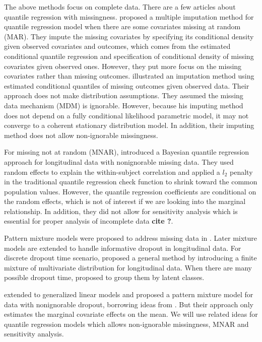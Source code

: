 \documentclass[12pt]{article}
\begin{document}
The above methods focus on complete data.  There are a few articles
about quantile regression with missingness.  \citet{wei2012} proposed
a multiple imputation method for quantile regression model when there
are some covariates missing at random (MAR). They impute the missing
covariates by specifying its conditional density given observed
covariates and outcomes, which comes from the estimated conditional
quantile regression and specification of conditional density of
missing covariates given observed ones.  However, they put more focus
on the missing covariates rather than missing outcomes.
\citet{bottai2013} illustrated an imputation method using estimated
conditional quantiles of missing outcomes given observed data. Their
approach does not make distribution assumptions.  They assumed the
missing data mechanism (MDM) is ignorable. However, because his
imputing method does not depend on a fully conditional likelihood
parametric model, it may not converge to a coherent stationary
distribution model. In addition, their imputing method does not allow
non-ignorable missingness.

For missing not at random (MNAR), \citet{yuan2010} introduced a
Bayesian quantile regression approach for longitudinal data with
nonignorable missing data. They used random effects to explain the
within-subject correlation and applied a $l_2$ penalty in the
traditional quantile regression check function to shrink toward the
common population values. However, the quantile regression
coefficients are conditional on the random effects, which is not of
interest if we are looking into the marginal relationship. In
addition, they did not allow for sensitivity analysis which is
essential for proper analysis of incomplete data {\bf cite ?}.

Pattern mixture models were proposed to address missing data in
\citet{rubin1977}. Later mixture models are extended to handle
informative dropout in longitudinal data. For discrete dropout time
scenario, \citet{little1993, little1994} proposed a general method by
introducing a finite mixture of multivariate distribution for
longitudinal data. When there are many possible dropout time,
\citet{roy2003} proposed to group them by latent classes.

\citet{roy2008} extended \cite{roy2003} to generalized linear models
and proposed a pattern mixture model for data with nonignorable
dropout, borrowing ideas from \citet{heagerty1999}.  But their
approach only estimates the marginal covariate effects on the mean. We
will use related ideas for quantile regression models which allows
non-ignorable missingness, MNAR and sensitivity analysis.
\end{document}
